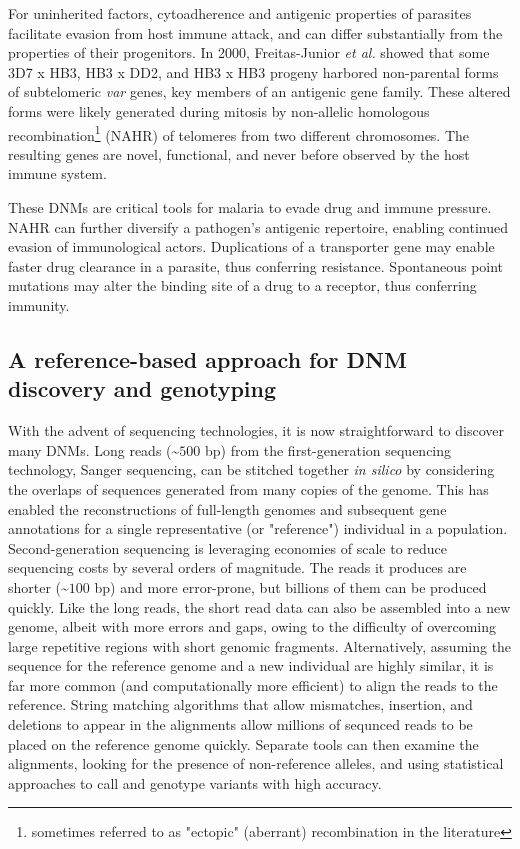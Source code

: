 For uninherited factors, cytoadherence and antigenic properties of parasites facilitate evasion from host immune attack, and can differ substantially from the properties of their progenitors.  In 2000, Freitas-Junior \textit{et al.} showed that some 3D7 x HB3, HB3 x DD2, and HB3 x HB3 progeny harbored non-parental forms of subtelomeric \textit{var} genes, key members of an antigenic gene family\cite{FreitasJunior:2000cp}.  These altered forms were likely generated during mitosis by non-allelic homologous recombination\footnote{sometimes referred to as "ectopic" (aberrant) recombination in the literature} (NAHR) of telomeres from two different chromosomes\cite{Duffy:2009cc}.  The resulting genes are novel, functional, and never before observed by the host immune system.

These DNMs are critical tools for malaria to evade drug and immune pressure.  NAHR can further diversify a pathogen's antigenic repertoire, enabling continued evasion of immunological actors.  Duplications of a transporter gene may enable faster drug clearance in a parasite, thus conferring resistance.  Spontaneous point mutations may alter the binding site of a drug to a receptor, thus conferring immunity. 

\subsection{A reference-based approach for DNM discovery and genotyping}

With the advent of sequencing technologies, it is now straightforward to discover many DNMs.  Long reads (\textasciitilde $500$ bp) from the first-generation sequencing technology, Sanger sequencing, can be stitched together \textit{in silico} by considering the overlaps of sequences generated from many copies of the genome\cite{Myers:1995vma}.  This has enabled the reconstructions of full-length genomes and subsequent gene annotations for a single representative (or "reference") individual in a population.  Second-generation sequencing is leveraging economies of scale to reduce sequencing costs by several orders of magnitude\cite{Mardis:2011cr}.  The reads it produces are shorter (\textasciitilde $100$ bp) and more error-prone, but billions of them can be produced quickly.  Like the long reads, the short read data can also be assembled into a new genome, albeit with more errors and gaps, owing to the difficulty of overcoming large repetitive regions with short genomic fragments\cite{Schatz:2010if}.  Alternatively, assuming the sequence for the reference genome and a new individual are highly similar, it is far more common (and computationally more efficient) to align the reads to the reference\cite{Flicek:2009dl}.  String matching algorithms that allow mismatches, insertion, and deletions to appear in the alignments allow millions of sequnced reads to be placed on the reference genome quickly.  Separate tools can then examine the alignments, looking for the presence of non-reference alleles, and using statistical approaches to call and genotype variants with high accuracy\cite{Nielsen:2011kz}.

